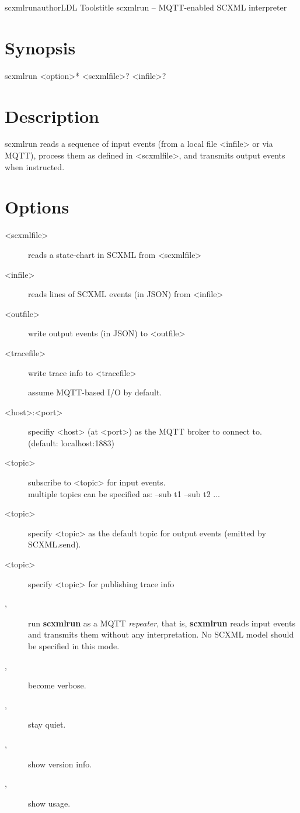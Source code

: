 \documentclass[fancy]{article}
\begin{document}
\begin{Name}{1}{scxmlrun}{author}{LDL Tools}{title}
scxmlrun -- MQTT-enabled SCXML interpreter
\end{Name}

\section{Synopsis}
scxmlrun <option>* <scxmlfile>? <infile>?

\section{Description}
scxmlrun reads
a sequence of input events (from a local file <infile> or via MQTT),
process them as defined in <scxmlfile>,
and transmits output events when instructed.

\section{Options}
\begin{description}
%
\item[ <scxmlfile>]
  reads a state-chart in SCXML from <scxmlfile>

\item[ <infile>]
  reads lines of SCXML events (in JSON) from <infile>
%
\item[ <outfile>]
  write output events (in JSON) to <outfile>
%
\item[ <tracefile>]
  write trace info to <tracefile>
%

\item[]
  assume MQTT-based I/O by default.
%
\item[ <host>\Lbr:<port>\Rbr]
  specifiy <host> (at <port>) as the MQTT broker to connect to.\\
  (default: localhost:1883)
%
\item[ <topic>]
  subscribe to <topic> for input events.\\
  multiple topics can be specified as: --sub t1 --sub t2 ...
%
\item[ <topic>]
  specify <topic> as the default topic for output events (emitted by SCXML.send).
%
\item[ <topic>]
  specify <topic> for publishing trace info

\item[, ]
  run \textbf{scxmlrun} as a MQTT \emph{repeater}, that is,
  \textbf{scxmlrun} reads input events and transmits them without any interpretation.
  No SCXML model should be specified in this mode.

\item[, ]
  become verbose.
%
\item[, ]
  stay quiet.
%
\item[, ]
  show version info.
%
\item[, ]
  show usage.

\end{description}
\end{document}
